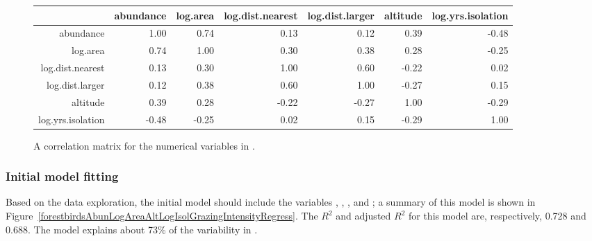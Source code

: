 \begin{figure}[ht]
	\footnotesize
	\centering
	\begin{tabular}{rrrrrrr}
		\hline
		& abundance & log.area & log.dist.nearest & log.dist.larger & altitude & log.yrs.isolation \\ 
		\hline
		abundance & 1.00 & 0.74 & 0.13 & 0.12 & 0.39 & -0.48 \\ 
		log.area & 0.74 & 1.00 & 0.30 & 0.38 & 0.28 & -0.25 \\ 
		log.dist.nearest & 0.13 & 0.30 & 1.00 & 0.60 & -0.22 & 0.02 \\ 
		log.dist.larger & 0.12 & 0.38 & 0.60 & 1.00 & -0.27 & 0.15 \\ 
		altitude & 0.39 & 0.28 & -0.22 & -0.27 & 1.00 & -0.29 \\ 
		log.yrs.isolation & -0.48 & -0.25 & 0.02 & 0.15 & -0.29 & 1.00 \\ 
		\hline
	\end{tabular}
\caption{A correlation matrix for the numerical variables in .}
\label{forestbirdsCorrelation}
\end{figure}


\subsubsection{Initial model fitting}

Based on the data exploration, the initial model should include the variables , , , and ; a summary of this model is shown in Figure~\ref{forestbirdsAbunLogAreaAltLogIsolGrazingIntensityRegress}. The $R^2$ and adjusted $R^2$ for this model are, respectively, 0.728 and 0.688.  The model explains about 73\% of the variability in .  

